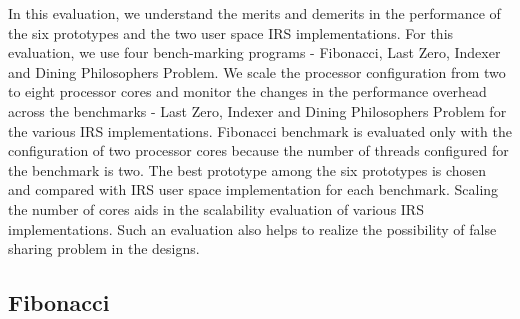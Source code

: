 In this evaluation, we understand the merits and demerits in the performance of the six prototypes and the two user space IRS implementations. 
For this evaluation, we use four bench-marking programs - Fibonacci, Last Zero, Indexer and Dining Philosophers Problem. 
We scale the processor configuration from two to eight processor cores and monitor the changes in the performance overhead across the benchmarks - Last Zero, Indexer and Dining Philosophers Problem for the various IRS implementations. 
Fibonacci benchmark is evaluated only with the configuration of two processor cores because the number of threads configured for the benchmark is two. 
The best prototype among the six prototypes is chosen and compared with IRS user space implementation for each benchmark.
Scaling the number of cores aids in the scalability evaluation of various IRS implementations. 
Such an evaluation also helps to realize the possibility of false sharing problem in the designs. 

\subsection{Fibonacci}

